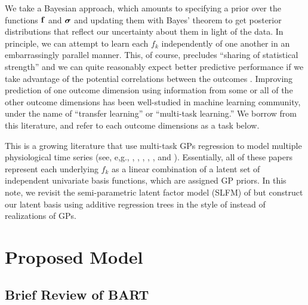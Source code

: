 \documentclass[12pt]{article}
\begin{document}
We take a Bayesian approach, which amounts to specifying a prior over the functions $\bf$ and $\bsigma$ and updating them with Bayes' theorem to get posterior distributions that reflect our uncertainty about them in light of the data.
In principle, we can attempt to learn each $f_{k}$ independently of one another in an embarrassingly parallel manner.
This, of course, precludes ``sharing of statistical strength'' and we can quite reasonably expect better predictive performance if we take advantage of the potential correlations between the outcomes \citep[see, e.g.,][]{Breiman1997}. 
Improving prediction of one outcome dimension using information from some or all of the other outcome dimensions has been well-studied in machine learning community, under the name of ``transfer learning'' or ``multi-task learning.''
We borrow from this literature, and refer to each outcome dimensions as a task below.

This is a growing literature that use multi-task GPs regression to model multiple physiological time series (see, e,g., \citet{Clifton2012}, \citet{Ghassemi2015}, \citet{Durichen2015}, \citet{Futoma2017}, \citet{Colopy2018}, and \citet{Cheng2018}). 
Essentially, all of these papers represent each underlying $f_{k}$ as a linear combination of a latent set of independent univariate basis functions, which are assigned GP priors.
In this note, we revisit the semi-parametric latent factor model (SLFM) of \citet{Teh2005} but construct our latent basis using additive regression trees in the style of \citet{Chipman2010} instead of realizations of GPs. 



\section{Proposed Model}
\label{sec:slfm_bart_model}

\subsection{Brief Review of BART}
\label{sec:bart_review}
\end{document}
